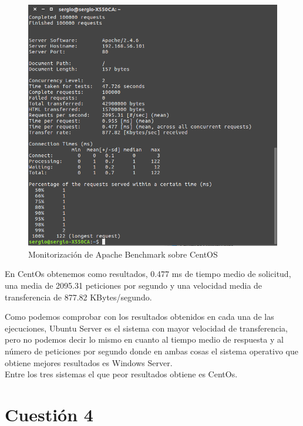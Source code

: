 \begin{figure}[H] %
	\centering
	\includegraphics[scale=0.5]{imagenes/ab-centos.png}  %
	\caption{Monitorización de Apache Benchmark sobre CentOS}
\end{figure}

En CentOs obtenemos como resultados, 0.477 ms de tiempo medio de solicitud, una media de 2095.31 peticiones por segundo y una velocidad media de transferencia de 877.82 KBytes/segundo.


\setlength{\parskip}{20pt}

Como podemos comprobar con los resultados obtenidos en cada una de las ejecuciones, 
Ubuntu Server es el sistema con mayor velocidad de transferencia, pero no podemos decir lo mismo en cuanto al tiempo medio de respuesta y al número de peticiones por segundo donde en ambas cosas el sistema operativo que obtiene mejores resultados es Windows Server. 
\\Entre los tres sistemas el que peor resultados obtiene es CentOs.



\section{Cuestión 4}

